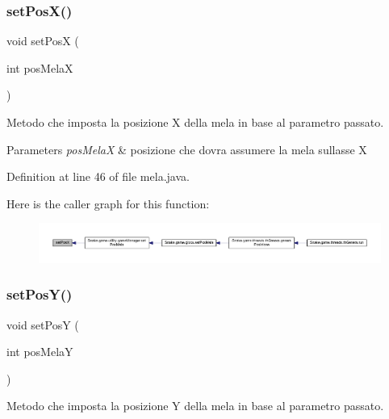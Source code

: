 \subsubsection{\texorpdfstring{set\+Pos\+X()}{setPosX()}}
{\footnotesize\ttfamily void set\+PosX (\begin{DoxyParamCaption}\item[{int}]{pos\+MelaX }\end{DoxyParamCaption})}



Metodo che imposta la posizione X della mela in base al parametro passato. 


\begin{DoxyParams}{Parameters}
{\em pos\+MelaX} & posizione che dovra\textquotesingle{} assumere la mela sull\textquotesingle{}asse X \\
\hline
\end{DoxyParams}


Definition at line 46 of file mela.\+java.

Here is the caller graph for this function\+:
\nopagebreak
\begin{figure}[H]
\begin{center}
\leavevmode
\includegraphics[width=350pt]{class_snake_1_1game_1_1vipera_1_1mela_aa5a2e0c6f2b05d50ca35ca417d298363_icgraph}
\end{center}
\end{figure}
\mbox{\label{class_snake_1_1game_1_1vipera_1_1mela_abb7df6a3b7f27271ff796f1b39d5b800}} 
\subsubsection{\texorpdfstring{set\+Pos\+Y()}{setPosY()}}
{\footnotesize\ttfamily void set\+PosY (\begin{DoxyParamCaption}\item[{int}]{pos\+MelaY }\end{DoxyParamCaption})}



Metodo che imposta la posizione Y della mela in base al parametro passato. 


